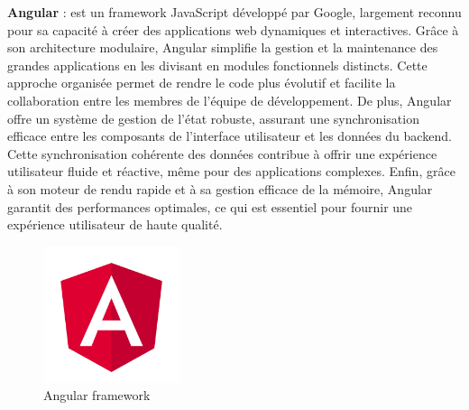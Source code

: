 \textbf{Angular} : est un framework JavaScript développé par Google, largement reconnu pour sa capacité à créer des applications web dynamiques et interactives. Grâce à son architecture modulaire, Angular simplifie la gestion et la maintenance des grandes applications en les divisant en modules fonctionnels distincts. Cette approche organisée permet de rendre le code plus évolutif et facilite la collaboration entre les membres de l'équipe de développement. De plus, Angular offre un système de gestion de l'état robuste, assurant une synchronisation efficace entre les composants de l'interface utilisateur et les données du backend. Cette synchronisation cohérente des données contribue à offrir une expérience utilisateur fluide et réactive, même pour des applications complexes. Enfin, grâce à son moteur de rendu rapide et à sa gestion efficace de la mémoire, Angular garantit des performances optimales, ce qui est essentiel pour fournir une expérience utilisateur de haute qualité.
\\
\begin{figure}[H]
    \centering
    \includegraphics[width=4cm]{Figures/angular.png}
    \caption{Angular framework}
\end{figure}



